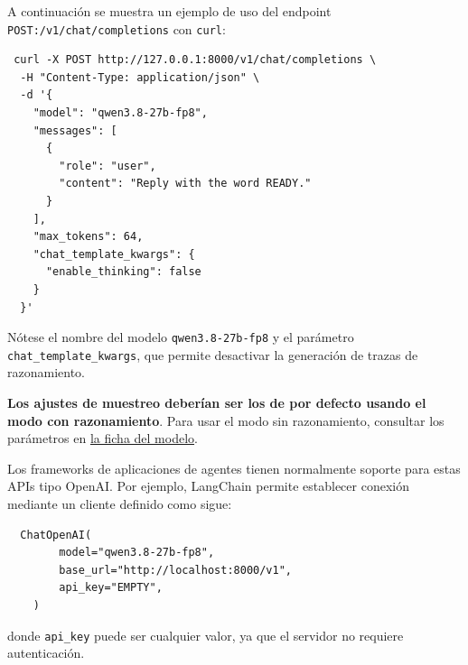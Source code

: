 \documentclass[11pt,a4paper]{article}
\newcommand{\code}[1]{{\small\texttt{#1}}}
\begin{document}
A continuación se muestra un ejemplo de uso del endpoint \code{POST:/v1/chat/completions} con \texttt{curl}:

\begin{verbatim}
 curl -X POST http://127.0.0.1:8000/v1/chat/completions \
  -H "Content-Type: application/json" \
  -d '{
    "model": "qwen3.8-27b-fp8",
    "messages": [
      {
        "role": "user",
        "content": "Reply with the word READY."
      }
    ],
    "max_tokens": 64,
    "chat_template_kwargs": {
      "enable_thinking": false
    }
  }' 
\end{verbatim}

Nótese el nombre del modelo \texttt{qwen3.8-27b-fp8} y el parámetro \texttt{chat\_template\_kwargs},
que permite desactivar la generación de trazas de razonamiento.

\textbf{Los ajustes de muestreo deberían ser los de por defecto usando el modo con razonamiento}. Para usar
el modo sin razonamiento, consultar los parámetros en \href{https://huggingface.co/Qwen/Qwen3.8-27B-FP8}{la ficha del modelo}.

Los frameworks de aplicaciones de agentes tienen normalmente soporte para estas APIs tipo OpenAI. Por ejemplo,
LangChain permite establecer conexión mediante un cliente definido como sigue:

\begin{verbatim}
  ChatOpenAI(
        model="qwen3.8-27b-fp8",
        base_url="http://localhost:8000/v1",
        api_key="EMPTY",
    )
\end{verbatim}

donde \code{api\_key} puede ser cualquier valor, ya que el servidor no requiere autenticación.
\end{document}
